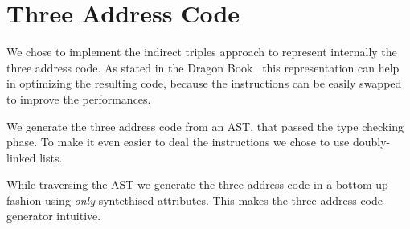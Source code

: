 \section{Three Address Code}
We chose to implement the indirect triples approach to represent internally
the three address code. As stated in the Dragon Book~\cite{dragonbook} this 
representation
can help in optimizing the resulting code, because the instructions can be
easily swapped to improve the performances.

We generate the three address code from an AST, that passed the type checking
phase. To make it even easier to deal the instructions we chose to use
doubly-linked lists.

While traversing the AST we generate the three address code in a bottom up
fashion using \emph{only} syntethised attributes. This makes the three address
code generator intuitive.

